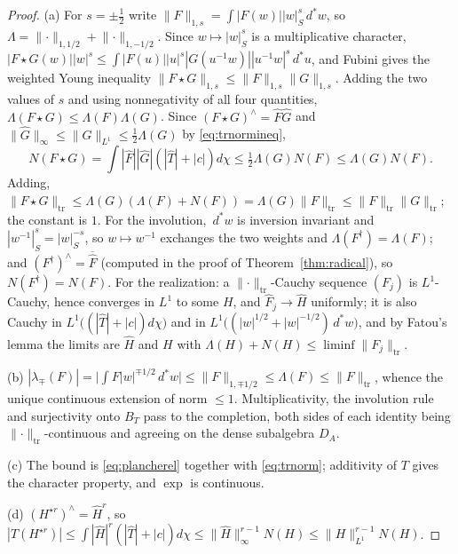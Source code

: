 \documentclass[11pt]{amsart}
\theoremstyle{definition}
\theoremstyle{remark}
\newcommand{\dstar}{\,d^{*}}
\newcommand{\Th}{\widehat{T}}
\newcommand{\DA}{D_A}
\newcommand{\BT}{B_T}
\begin{document}
\begin{proof}
(a)  For $s=\pm\tfrac12$ write $\lVert F\rVert_{1,s}=\int|F(w)||w|_S^{s}\dstar
w$, so $\Lambda=\lVert\cdot\rVert_{1,1/2}+\lVert\cdot\rVert_{1,-1/2}$.  Since
$w\mapsto|w|_S^{s}$ is a multiplicative character,
$|F\star G(w)||w|^{s}\le\int|F(u)||u|^{s}|G(u^{-1}w)||u^{-1}w|^{s}\dstar u$,
and Fubini gives the weighted Young inequality
$\lVert F\star G\rVert_{1,s}\le\lVert F\rVert_{1,s}\lVert G\rVert_{1,s}$.
Adding the two values of $s$ and using nonnegativity of all four quantities,
$\Lambda(F\star G)\le\Lambda(F)\Lambda(G)$.  Since $(F\star G)^{\wedge}=
\widehat F\widehat G$ and $\lVert\widehat G\rVert_{\infty}\le\lVert
G\rVert_{L^{1}}\le\tfrac12\Lambda(G)$ by \eqref{eq:trnormineq},
\[
N(F\star G)=\int|\widehat F||\widehat G|(|\Th|+|c|)d\chi
\le\tfrac12\Lambda(G)N(F)\le\Lambda(G)N(F).
\]
Adding, $\lVert F\star G\rVert_{\mathrm{tr}}\le\Lambda(G)
(\Lambda(F)+N(F))=\Lambda(G)\lVert F\rVert_{\mathrm{tr}}\le
\lVert F\rVert_{\mathrm{tr}}\lVert G\rVert_{\mathrm{tr}}$; the constant is $1$.
For the involution, $\dstar w$ is inversion invariant and
$|w^{-1}|_S^{s}=|w|_S^{-s}$, so $w\mapsto w^{-1}$ exchanges the two weights
and $\Lambda(F^{\dagger})=\Lambda(F)$; and $(F^{\dagger})^{\wedge}=
\overline{\widehat F}$ (computed in the proof of Theorem~\ref{thm:radical}), so
$N(F^{\dagger})=N(F)$.  For the realization: a
$\lVert\cdot\rVert_{\mathrm{tr}}$-Cauchy sequence $(F_j)$ is $L^{1}$-Cauchy,
hence converges in $L^{1}$ to some $H$, and $\widehat F_j\to\widehat H$
uniformly; it is also Cauchy in $L^{1}\bigl((|\Th|+|c|)d\chi\bigr)$ and in
$L^{1}\bigl((|w|^{1/2}+|w|^{-1/2})\dstar w\bigr)$, and by Fatou's lemma the
limits are $\widehat H$ and $H$ with $\Lambda(H)+N(H)\le
\liminf\lVert F_j\rVert_{\mathrm{tr}}$.

(b)  $|\lambda_{\mp}(F)|=\bigl|\int F|w|^{\mp1/2}\dstar w\bigr|\le
\lVert F\rVert_{1,\mp1/2}\le\Lambda(F)\le\lVert F\rVert_{\mathrm{tr}}$, whence
the unique continuous extension of norm $\le1$.  Multiplicativity, the
involution rule and surjectivity onto $\BT$ pass to the completion, both sides
of each identity being $\lVert\cdot\rVert_{\mathrm{tr}}$-continuous and
agreeing on the dense subalgebra $\DA$.

(c)  The bound is \eqref{eq:plancherel} together with
\eqref{eq:trnorm}; additivity of $T$ gives the character property, and $\exp$
is continuous.

(d)  $(H^{\star r})^{\wedge}=\widehat H^{r}$, so
$|T(H^{\star r})|\le\int|\widehat H|^{r}(|\Th|+|c|)d\chi\le
\lVert\widehat H\rVert_{\infty}^{r-1}N(H)\le\lVert H\rVert_{L^{1}}^{r-1}N(H)$.


\end{proof}
\end{document}
